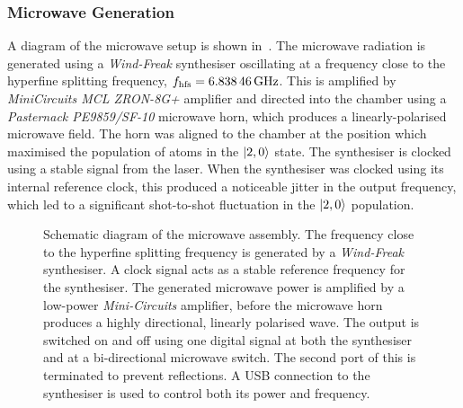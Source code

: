 \subsubsection{Microwave Generation}
A diagram of the microwave setup is shown
in~. The microwave radiation is
generated using a \textit{Wind-Freak} synthesiser oscillating at a frequency close to the hyperfine
splitting frequency, \(f_\text{hfs} =
\sivalue{6.83846}{\giga\hertz}\). This is amplified by
\textit{MiniCircuits MCL ZRON-8G+} amplifier and directed into the
chamber using a \textit{Pasternack PE9859/SF-10} microwave horn, which
produces a linearly-polarised microwave field. The horn was aligned to
the chamber at the position which maximised the population of atoms in
the \(\ket{2,0}\) state. The synthesiser is clocked using a stable
 signal from the \Muquans{} laser. When the
synthesiser was clocked using its internal 
reference clock, this produced a noticeable jitter in the output
frequency, which led to a significant shot-to-shot fluctuation in the
\(\ket{2,0}\) population.
\begin{figure}[!htbp]
    \centering
    \resizebox{0.5\textwidth}{!}{}
    \caption[Setup for Microwaves]{Schematic diagram of the microwave
    assembly. The frequency close to the hyperfine splitting frequency
  is generated by a \textit{Wind-Freak} synthesiser. A
 clock signal acts as a stable reference
frequency for the synthesiser. The generated microwave power is
amplified by a low-power \textit{Mini-Circuits}
amplifier, before the microwave horn produces a highly
directional, linearly polarised wave. The output is switched on and
off using one 
digital signal at both the synthesiser and at a bi-directional
microwave switch. The second port of this is terminated to prevent reflections. A USB connection 
to the synthesiser is used to control both its power and frequency.}
    \label{fig:microwave_setup}
\end{figure}

